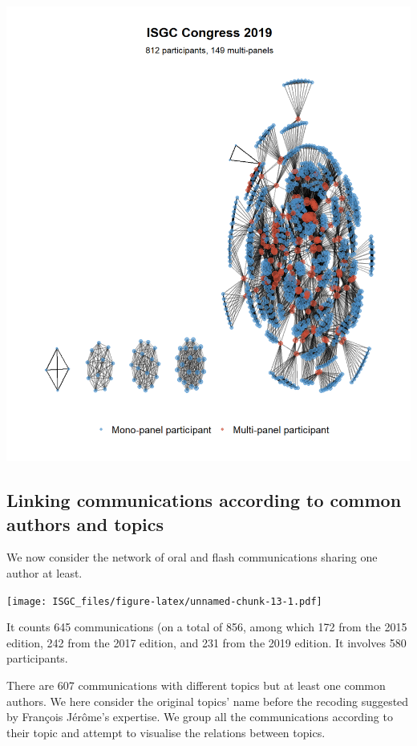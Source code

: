 \documentclass[
]{article}
\begin{document}
\includegraphics[width=16.67in]{plots/congres-isgc2019-1mode}

\hypertarget{linking-communications-according-to-common-authors-and-topics}{%
\subsection{Linking communications according to common authors and
topics}\label{linking-communications-according-to-common-authors-and-topics}}

We now consider the network of oral and flash communications sharing one
author at least.

\texttt{[image: ISGC\_files/figure-latex/unnamed-chunk-13-1.pdf]}

It counts 645 communications (on a total of 856, among which 172 from
the 2015 edition, 242 from the 2017 edition, and 231 from the 2019
edition. It involves 580 participants.

There are 607 communications with different topics but at least one
common authors. We here consider the original topics' name before the
recoding suggested by François Jérôme's expertise. We group all the
communications according to their topic and attempt to visualise the
relations between topics.
\end{document}
